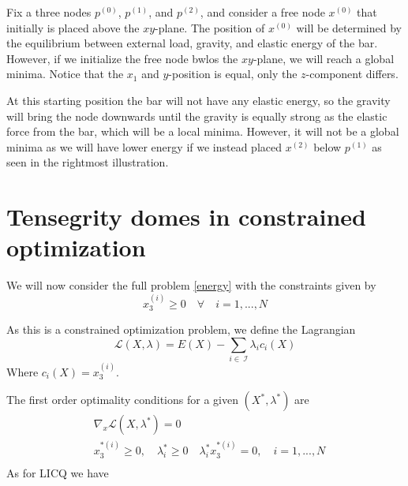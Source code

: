 Fix a three nodes $p^{(0)}$, $p^{(1)}$, and $p^{(2)}$, and consider a free node $x^{(0)}$ that initially is placed above the $xy$-plane. The position of $x^{(0)}$ will be determined by the equilibrium between external load, gravity, and elastic energy of the bar. However, if we initialize the free node bwlos the $xy$-plane, we will reach a global minima. Notice that the $x_1$ and $y$-position is equal, only the $z$-component differs.


At this starting position the bar will not have any elastic energy, so the gravity will bring the node downwards until the gravity is equally strong as the elastic force from the bar, which will be a local minima. However, it will not be a global minima as we will have lower energy if we instead placed $x^{(2)}$ below $p^{(1)}$ as seen in the rightmost illustration. 



\section{Tensegrity domes in constrained optimization}\label{sec:freestanding}
We will now consider the full problem \eqref{energy} with the constraints given by 
\begin{equation}
    x_3^{(i)} \geq 0 \quad \forall \quad i = 1,...,N \label{eq:aboveground}
\end{equation}

As this is a constrained optimization problem, we define the Lagrangian \begin{equation}
    \mathcal{L}(X,\lambda) = E(X) - \sum_{i \in \ \mathcal{I}}\lambda_i c_i(X)
\end{equation}
Where $c_i(X) = x^{(i)}_3$.

The first order optimality conditions for a given $(X^*,\lambda^*)$ are \begin{equation}
\begin{aligned}
       &\nabla_x \mathcal{L}(X,\lambda^*)=0\\ 
       &x^{*(i)}_3 \geq 0,\quad \lambda_i^* \geq 0 \quad \lambda_i^* x^{*(i)}_3 = 0,\quad i = 1,...,N\\
\end{aligned}
\end{equation}
As for LICQ we have 


